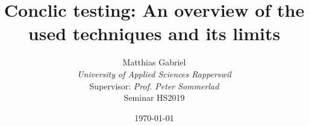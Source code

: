 \documentclass[journal]{IEEEtran}
\begin{document}
\title{Conclic testing: An overview of the used techniques and its limits}
\author{Matthias Gabriel\\\textit{University of Applied Sciences Rapperswil}\\[1cm]{\small Supervisor: \textit{Prof. Peter Sommerlad}\\Seminar HS2019}}
\date{\today}
\maketitle










\end{document}
